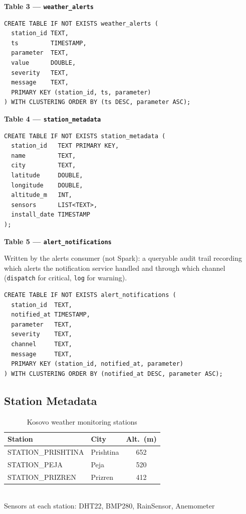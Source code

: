 \documentclass[conference,a4paper]{IEEEtran}
\begin{document}
\textbf{Table 3 --- \texttt{weather\_alerts}}

\begin{lstlisting}[language=CQL]
CREATE TABLE IF NOT EXISTS weather_alerts (
  station_id TEXT,
  ts         TIMESTAMP,
  parameter  TEXT,
  value      DOUBLE,
  severity   TEXT,
  message    TEXT,
  PRIMARY KEY (station_id, ts, parameter)
) WITH CLUSTERING ORDER BY (ts DESC, parameter ASC);
\end{lstlisting}

\textbf{Table 4 --- \texttt{station\_metadata}}

\begin{lstlisting}[language=CQL]
CREATE TABLE IF NOT EXISTS station_metadata (
  station_id   TEXT PRIMARY KEY,
  name         TEXT,
  city         TEXT,
  latitude     DOUBLE,
  longitude    DOUBLE,
  altitude_m   INT,
  sensors      LIST<TEXT>,
  install_date TIMESTAMP
);
\end{lstlisting}

\textbf{Table 5 --- \texttt{alert\_notifications}}

Written by the alerts consumer (not Spark): a queryable audit trail recording
which alerts the notification service handled and through which channel
(\texttt{dispatch} for critical, \texttt{log} for warning).

\begin{lstlisting}[language=CQL]
CREATE TABLE IF NOT EXISTS alert_notifications (
  station_id  TEXT,
  notified_at TIMESTAMP,
  parameter   TEXT,
  severity    TEXT,
  channel     TEXT,
  message     TEXT,
  PRIMARY KEY (station_id, notified_at, parameter)
) WITH CLUSTERING ORDER BY (notified_at DESC, parameter ASC);
\end{lstlisting}

\subsection{Station Metadata}

\begin{table}[H]
\centering
\caption{Kosovo weather monitoring stations}
\label{tab:stations}
\begin{tabular}{llc}
\toprule
\textbf{Station} & \textbf{City} & \textbf{Alt.\ (m)} \\
\midrule
STATION\_PRISHTINA & Prishtina & 652 \\
STATION\_PEJA      & Peja      & 520 \\
STATION\_PRIZREN   & Prizren   & 412 \\
\bottomrule
\end{tabular}\\[3pt]
\small Sensors at each station: DHT22, BMP280, RainSensor, Anemometer
\end{table}
\end{document}
